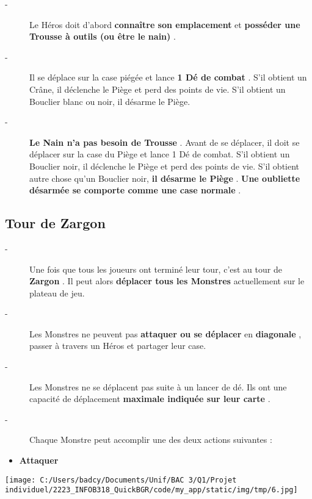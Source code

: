 \documentclass{scrartcl}%
\begin{document}
\begin{description}%
\item[{-} ]%
%
 Le Héros doit d'abord %
\textcolor{mygreen}{%
\textbf{connaître son emplacement}%
}%
\textit{ }%
 et %
\textcolor{mygreen}{%
\textbf{posséder une Trousse à outils (ou être le nain)}%
}%
.
%
\item[{-} ]%
%
 Il se déplace sur la case piégée et lance %
\textcolor{mygreen}{%
\textbf{1 Dé de combat}%
}%
. S'il obtient un Crâne, il déclenche le Piège et perd des points de vie. S'il obtient un Bouclier blanc ou noir, il désarme le Piège.
%
\item[{-} ]%
%
\textcolor{mygreen}{%
\textbf{Le Nain n'a pas besoin de Trousse}%
}%
. Avant de se déplacer, il doit se déplacer sur la case du Piège et lance 1 Dé de combat. S'il obtient un Bouclier noir, il déclenche le Piège et perd des points de vie. S'il obtient autre chose qu'un Bouclier noir, %
\textcolor{mygreen}{%
\textbf{il désarme le Piège}%
}%
. %
\textcolor{mygreen}{%
\textbf{Une oubliette désarmée se comporte comme une case normale}%
}%
.
%
\end{description}

%
\subsection{ Tour de Zargon
}%
\label{subsec:TourdeZargon}%
\begin{description}%
\item[{-} ]%
%
 Une fois que tous les joueurs ont terminé leur tour, c'est au tour de %
\textcolor{mygreen}{%
\textbf{Zargon}%
}%
. Il peut alors%
\textcolor{mygreen}{%
\textbf{ déplacer tous les Monstres}%
}%
\textit{ }%
 actuellement sur le plateau de jeu.
%
\item[{-} ]%
%
 Les Monstres ne peuvent pas%
\textcolor{mygreen}{%
\textbf{attaquer ou se déplacer}%
}%
\textit{ }%
 en %
\textcolor{mygreen}{%
\textbf{diagonale}%
}%
, passer à travers un Héros et partager leur case.
%
\item[{-} ]%
%
 Les Monstres ne se déplacent pas suite à un lancer de dé. Ils ont une capacité de déplacement %
\textcolor{mygreen}{%
\textbf{maximale indiquée sur leur carte}%
}%
.
%
\item[{-} ]%
%
 Chaque Monstre peut accomplir une des deux actions suivantes :
%
\end{description}%
\begin{itemize}%
\item%
%
\textcolor{mygreen}{%
\textbf{Attaquer}%
}%

%
\end{itemize}%
%
\begin{center}\texttt{[image: C:/Users/badcy/Documents/Unif/BAC 3/Q1/Projet individuel/2223\_INFOB318\_QuickBGR/code/my\_app/static/img/tmp/6.jpg]}\end{center}%
\end{document}

